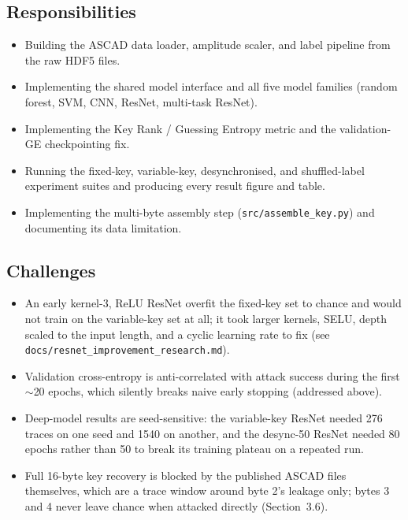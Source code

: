 \subsection{Responsibilities}

\begin{itemize}
\item Building the ASCAD data loader, amplitude scaler, and label pipeline from the
      raw HDF5 files.
\item Implementing the shared model interface and all five model families (random
      forest, SVM, CNN, ResNet, multi-task ResNet).
\item Implementing the Key Rank / Guessing Entropy metric and the validation-GE
      checkpointing fix.
\item Running the fixed-key, variable-key, desynchronised, and shuffled-label
      experiment suites and producing every result figure and table.
\item Implementing the multi-byte assembly step (\texttt{src/assemble\_key.py}) and
      documenting its data limitation.
\end{itemize}

\subsection{Challenges}

\begin{itemize}
\item An early kernel-3, ReLU ResNet overfit the fixed-key set to chance and would
      not train on the variable-key set at all; it took larger kernels, SELU,
      depth scaled to the input length, and a cyclic learning rate to fix (see
      \texttt{docs/resnet\_improvement\_research.md}).
\item Validation cross-entropy is anti-correlated with attack success during the
      first $\sim$20 epochs, which silently breaks naive early stopping (addressed
      above).
\item Deep-model results are seed-sensitive: the variable-key ResNet needed 276
      traces on one seed and 1540 on another, and the desync-50 ResNet needed 80
      epochs rather than 50 to break its training plateau on a repeated run.
\item Full 16-byte key recovery is blocked by the published ASCAD files themselves,
      which are a trace window around byte 2's leakage only; bytes 3 and 4 never
      leave chance when attacked directly (Section~3.6).
\end{itemize}

